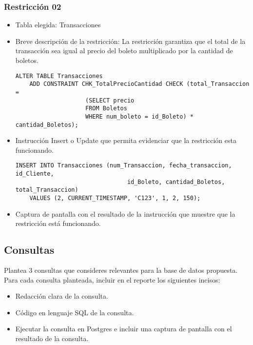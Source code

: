 \subsubsection*{Restricción 02}
\begin{itemize}
    \item Tabla elegida: Transacciones
    \item Breve descripción de la restricción: La restricción garantiza que el total de la transacción sea igual al precio del boleto multiplicado por la cantidad de boletos.
    
    \begin{lstlisting}[caption={Tablas para la BdDatos}, label={lst:sql_estadios}]
    ALTER TABLE Transacciones
    ADD CONSTRAINT CHK_TotalPrecioCantidad CHECK (total_Transaccion = 
                    (SELECT precio 
                    FROM Boletos 
                    WHERE num_boleto = id_Boleto) * cantidad_Boletos);        
    \end{lstlisting}

    \item Instrucción Insert o Update que permita evidenciar que la restricción esta funcionando.
    
    \begin{lstlisting}[caption={Tablas para la BdDatos}, label={lst:sql_estadios}]
    INSERT INTO Transacciones (num_Transaccion, fecha_transaccion, id_Cliente, 
                                id_Boleto, cantidad_Boletos, total_Transaccion)
    VALUES (2, CURRENT_TIMESTAMP, 'C123', 1, 2, 150);     
    \end{lstlisting}

    \item Captura de pantalla con el resultado de la instrucción que muestre que la restricción está
    funcionando.
\end{itemize}

\subsection{Consultas}

Plantea 3 consultas que consideres relevantes para la base de datos propuesta. Para cada consulta planteada, incluir en el reporte los siguientes incisos:
\begin{itemize}
    \item Redacción clara de la consulta.
    \item Código en lenguaje SQL de la consulta.
    \item Ejecutar la consulta en Postgres e incluir una captura de pantalla con el resultado de la
    consulta.
\end{itemize}

